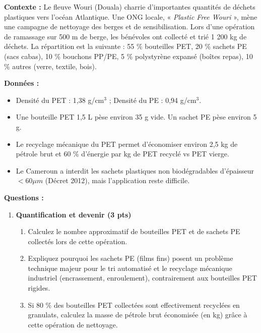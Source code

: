 \documentclass[11pt]{article}
\begin{document}
\begin{exercice}
\textbf{Contexte :} Le fleuve Wouri (Douala) charrie d'importantes quantités de déchets plastiques vers l'océan Atlantique. Une ONG locale, « \emph{Plastic Free Wouri} », mène une campagne de nettoyage des berges et de sensibilisation. Lors d'une opération de ramassage sur 500 m de berge, les bénévoles ont collecté et trié 1 200 kg de déchets. La répartition est la suivante : 55 \% bouteilles PET, 20 \% sachets PE (sacs cabas), 10 \% bouchons PP/PE, 5 \% polystyrène expansé (boîtes repas), 10 \% autres (verre, textile, bois).

\textbf{Données :}
\begin{itemize}
    \item Densité du PET : 1,38 g/cm$^3$ ; Densité du PE : 0,94 g/cm$^3$.
    \item Une bouteille PET 1,5 L pèse environ 35 g vide. Un sachet PE pèse environ 5 g.
    \item Le recyclage mécanique du PET permet d'économiser environ 2,5 kg de pétrole brut et 60 \% d'énergie par kg de PET recyclé vs PET vierge.
    \item Le Cameroun a interdit les sachets plastiques non biodégradables d'épaisseur $< 60 \mu m$ (Décret 2012), mais l'application reste difficile.
\end{itemize}

\textbf{Questions :}

\begin{enumerate}
    \item \textbf{Quantification et devenir (3 pts)}
    \begin{enumerate}
        \item Calculez le nombre approximatif de bouteilles PET et de sachets PE collectés lors de cette opération.
        \item Expliquez pourquoi les sachets PE (films fins) posent un problème technique majeur pour le tri automatisé et le recyclage mécanique industriel (encrassement, enroulement), contrairement aux bouteilles PET rigides.
        \item Si 80 \% des bouteilles PET collectées sont effectivement recyclées en granulats, calculez la masse de pétrole brut économisée (en kg) grâce à cette opération de nettoyage.
    \end{enumerate}


\end{enumerate}
\end{exercice}
\end{document}
